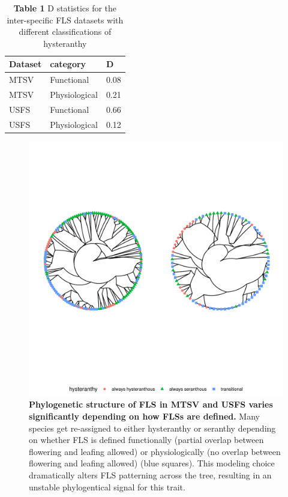 \documentclass[12pt]{article}\usepackage[]{graphicx}\usepackage[]{color}
\makeatletter
\newenvironment{kframe}{%
 \def\at@end@of@kframe{}%
 \ifinner\ifhmode%
  \def\at@end@of@kframe{\end{minipage}}%
  \begin{minipage}{\columnwidth}%
 \fi\fi%
 \def\FrameCommand##1{\hskip\@totalleftmargin \hskip-\fboxsep
 \colorbox{shadecolor}{##1}\hskip-\fboxsep
     \hskip-\linewidth \hskip-\@totalleftmargin \hskip\columnwidth}%
 \MakeFramed {\advance\hsize-\width
   \@totalleftmargin\z@ \linewidth\hsize
   \@setminipage}}%
 {\par\unskip\endMakeFramed%
 \at@end@of@kframe}
\makeatother
\begin{document}
{\begin{kframe}


{\ttfamily\noindent\color{warningcolor}{\#\# Warning: package 'MASS' was built under R version 3.4.3}}\end{kframe}%
\begin{table}[ht]
\centering
\begin{tabular}{l|l|l}
  \hline
Dataset & category & D \\ 
  \hline
MTSV & Functional & 0.08 \\ 
  MTSV & Physiological & 0.21 \\ 
  USFS & Functional & 0.66 \\ 
  USFS & Physiological & 0.12 \\ 
   \hline
\end{tabular}
\caption{\textbf{Table 1} D statistics for the inter-specific FLS datasets with different classifications of hysteranthy} 
\label{tab:Dstats}
\end{table}


\begin{figure}[H]

\includegraphics[width=7.5in]{figure/Code_chunk_Minimal_example3-1} 

   
  \caption{\textbf{Phylogenetic structure of FLS in MTSV and USFS varies significantly depending on how FLSs are defined.} Many species get re-assigned to either hysteranthy or seranthy depending on whether FLS is defined functionally (partial overlap between flowering and leafing allowed) or physiologically (no overlap between flowering and leafing allowed) (blue squares). This modeling choice dramatically alters FLS patterning across the tree, resulting in an unstable phylogentical signal for this trait.}
    \label{fig:phylogeny}
    \end{figure}
  
  
\pagebreak

\end{document}
